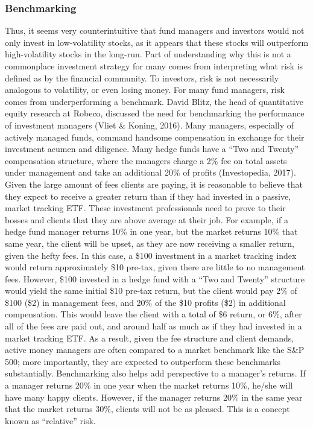 \documentclass[12pt,twoside]{reedthesis}
\theoremstyle{definition}
\theoremstyle{definition}
\theoremstyle{definition}
\theoremstyle{remark}
\begin{document}
\subsubsection{Benchmarking}\label{benchmarking}

Thus, it seems very counterintuitive that fund managers and investors
would not only invest in low-volatility stocks, as it appears that these
stocks will outperform high-volatility stocks in the long-run. Part of
understanding why this is not a commonplace investment strategy for many
comes from interpreting what risk is defined as by the financial
community. To investors, risk is not necessarily analogous to
volatility, or even losing money. For many fund managers, risk comes
from underperforming a benchmark. David Blitz, the head of quantitative
equity research at Robeco, discussed the need for benchmarking the
performance of investment managers (Vliet \& Koning, 2016). Many
managers, especially of actively managed funds, command handsome
compensation in exchange for their investment acumen and diligence. Many
hedge funds have a ``Two and Twenty'' compensation structure, where the
managers charge a 2\% fee on total assets under management and take an
additional 20\% of profits (Investopedia, 2017). Given the large amount
of fees clients are paying, it is reasonable to believe that they expect
to receive a greater return than if they had invested in a passive,
market tracking ETF. These investment professionals need to prove to
their bosses and clients that they are above average at their job. For
example, if a hedge fund manager returns 10\% in one year, but the
market returns 10\% that same year, the client will be upset, as they
are now receiving a smaller return, given the hefty fees. In this case,
a \$100 investment in a market tracking index would return approximately
\$10 pre-tax, given there are little to no management fees. However,
\$100 invested in a hedge fund with a ``Two and Twenty'' structure would
yield the same initial \$10 pre-tax return, but the client would pay 2\%
of \$100 (\$2) in management fees, and 20\% of the \$10 profits (\$2) in
additional compensation. This would leave the client with a total of \$6
return, or 6\%, after all of the fees are paid out, and around half as
much as if they had invested in a market tracking ETF. As a result,
given the fee structure and client demands, active money managers are
often compared to a market benchmark like the S\&P 500; more
importantly, they are expected to outperform these benchmarks
substantially. Benchmarking also helps add perspective to a manager's
returns. If a manager returns 20\% in one year when the market returns
10\%, he/she will have many happy clients. However, if the manager
returns 20\% in the same year that the market returns 30\%, clients will
not be as pleased. This is a concept known as ``relative'' risk.
\end{document}
